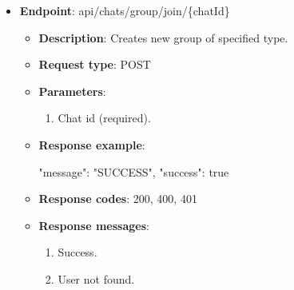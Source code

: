 \begin{itemize}
\begin{itemize}
        \item \textbf{Response codes}: 200, 400, 401

        \item \textbf{Response messages}:
        \begin{enumerate}
            \item Success.
            \item User not found.
        \end{enumerate}
    \end{itemize}

    \item \textbf{Endpoint}: api/chats/group/join/\{chatId\}

    \begin{itemize}
        \item \textbf{Description}: Creates new group of specified type.

        \item \textbf{Request type}: POST

        \item \textbf{Parameters}:

        \begin{enumerate}
            \item Chat id (required).
        \end{enumerate}

        \item \textbf{Response example}:

        \begin{spverbatim}
        {
            "message": "SUCCESS",
            "success": true
        }
        \end{spverbatim}

        \item \textbf{Response codes}: 200, 400, 401

        \item \textbf{Response messages}:
        \begin{enumerate}
            \item Success.
            \item User not found.
        \end{enumerate}
    \end{itemize}
\end{itemize}

